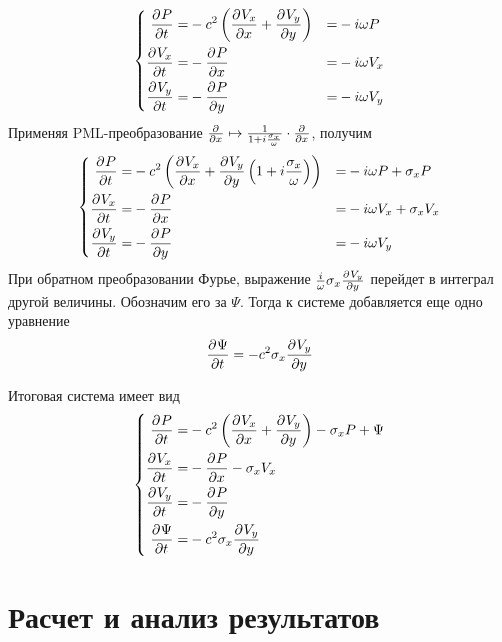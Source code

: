 \documentclass[a4paper, fontsize=14pt]{article}
\begin{document}
\begin{equation}
	\label{pmlsys}
	\left\{
	\begin{aligned}
		\diff{P}{t} =& -c^2 \left( \diff{V_x}{x} + \diff{V_y}{y} \right) &=& -i\omega P\\
		\diff{V_x}{t} =& - \diff{P}{x} &=& -i\omega V_x\\
		\diff{V_y}{t} =& - \diff{P}{y} &=& -i\omega V_y
	\end{aligned}
	\right.
\end{equation}
Применяя PML-преобразование $\frac{\partial ^ {  } }{\partial x ^ {  } } \mapsto
\frac{1}{1+i\frac{\sigma_x}{\omega}}\cdot\frac{\partial ^ {  } }{\partial x ^ {  } }$, получим 
\begin{equation}
	\label{pmlsystransformed}
	\left\{
	\begin{aligned}
		\diff{P}{t} =& -c^2 \left( \diff{V_x}{x} +
		\diff{V_y}{y}\left(1+i\frac{\sigma_x}{\omega}\right) \right) &=& -i\omega P+\sigma_x P\\
		\diff{V_x}{t} =& - \diff{P}{x} &=& -i\omega V_x+\sigma_x V_x\\
		\diff{V_y}{t} =& - \diff{P}{y} &=& -i\omega V_y
	\end{aligned}
	\right.
\end{equation}
При обратном преобразовании Фурье, выражение $\frac{i}{\omega}\sigma_x \frac{\partial ^ {  } V_y}{\partial y ^ {  } }$ перейдет в
интеграл другой величины. Обозначим его за $\Psi$. Тогда к системе добавляется еще одно уравнение
\begin{equation}
	\frac{\partial ^ {  } \Psi}{\partial t ^ {  } } = -c^2 \sigma_x \frac{\partial ^ {  } V_y}{\partial y ^ {  } }
\end{equation}

	Итоговая система имеет вид
\begin{equation}
	\label{pmlsysfinal}
	\left\{
	\begin{aligned}
		\diff{P}{t} =& -c^2 \left( \diff{V_x}{x} +
		\diff{V_y}{y} \right) -\sigma_x P+\Psi\\
		\diff{V_x}{t} =& - \diff{P}{x} -\sigma_x V_x\\
		\diff{V_y}{t} =& - \diff{P}{y} \\
		\diff{\Psi}{t} =& -c^2 \sigma_x \diff{V_y}{y}
	\end{aligned}
	\right.
\end{equation}
\cite{npml}
\section{Расчет и анализ результатов}
\end{document}
